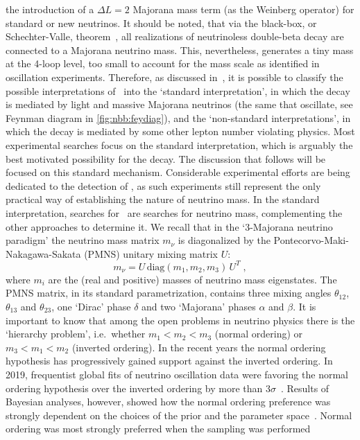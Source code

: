 the introduction of a $\Delta L = 2$ Majorana mass term (as the Weinberg operator) for
standard or new neutrinos.  It should be noted, that via the black-box, or
Schechter-Valle, theorem~\cite{Schechter1982}, all realizations of neutrinoless
double-beta decay are connected to a Majorana neutrino mass. This, nevertheless, generates a
tiny mass at the 4-loop level, too small to account for the mass scale as identified in
oscillation experiments.  Therefore, as discussed in~\cite{Rodejohann2011}, it is possible
to classify the possible interpretations of \onbb\ into the `standard interpretation', in
which the decay is mediated by light and massive Majorana neutrinos (the same that
oscillate, see Feynman diagram in \cref{fig:nbb:feydiag}), and the `non-standard
interpretations', in which the decay is mediated by some other lepton number violating
physics. Most experimental searches focus on the standard interpretation, which is
arguably the best motivated possibility for the decay. The discussion that follows will be
focused on this standard mechanism. Considerable experimental efforts are being dedicated
to the detection of \onbb, as such experiments still represent the only practical way of
establishing the nature of neutrino mass.
\newpar
In the standard interpretation, searches for \onbb\ are searches for neutrino mass,
complementing the other approaches to determine it. We recall that in the `3-Majorana
neutrino paradigm' the neutrino mass matrix $m_\nu$ is diagonalized by the
Pontecorvo-Maki-Nakagawa-Sakata (PMNS) unitary mixing matrix $U$:
\[
  m_\nu = U \, \text{diag}(m_1, m_2, m_3) \, U^T \;,
\]
where $m_i$ are the (real and positive) masses of neutrino mass eigenstates.  The PMNS
matrix, in its standard parametrization, contains three mixing angles $\theta_{12}$,
$\theta_{13}$ and $\theta_{23}$, one `Dirac' phase $\delta$ and two `Majorana' phases
$\alpha$ and $\beta$. It is important to know that among the open problems in neutrino
physics there is the `hierarchy problem', i.e.~whether $m_1 < m_2 < m_3$ (normal ordering)
or $m_3 < m_1 < m_2$ (inverted ordering).  In the recent years the normal ordering
hypothesis has progressively gained support against the inverted ordering. In 2019,
frequentist global fits of neutrino oscillation data were favoring the normal ordering
hypothesis over the inverted ordering by more than $3\sigma$~\cite{Esteban2019}. Results
of Bayesian analyses, however, showed how the normal ordering preference was strongly
dependent on the choices of the prior and the parameter space~\cite{Hannestad2016,
Schwetz2017}. Normal ordering was most strongly preferred when the sampling was performed
